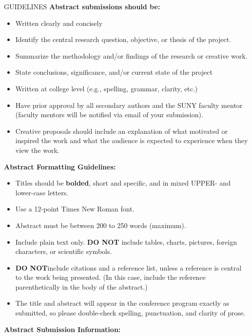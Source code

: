 \documentclass[12pt]{article}
\begin{document}
 GUIDELINES
    \textbf{Abstract submissions should be:}
    \begin{itemize}
    \item Written clearly and concisely
    \item Identify the central research question, objective, or thesis of the project.
    \item Summarize the methodology and/or findings of the research or creative work.
    \item State conclusions, significance, and/or current state of the project
    \item Written at college level (e.g., spelling, grammar, clarity, etc.)
    \item Have prior approval by all secondary authors and the SUNY faculty mentor (faculty mentors will be notified via email of your submission).
    \item Creative proposals should include an explanation of what motivated or inspired the work and what the audience is expected to experience when they view the work.
    \end{itemize}

    \textbf{Abstract Formatting Guidelines:}

    \begin{itemize}
    \item Titles should be \textbf{bolded}, short and specific, and in mixed UPPER- and lower-case letters.
    \item Use a 12-point Times New Roman font.
    \item Abstract must be between 200 to 250 words (maximum).
    \item Include plain text only. \textbf{DO NOT} include tables, charts, pictures, foreign characters, or scientific symbols.
    \item \textbf{DO NOT}include citations and a reference list, unless a reference is central to the work being presented. (In this case, include the reference parenthetically in the body of the abstract.)
    \item The title and abstract will appear in the conference program exactly as submitted, so please double-check spelling, punctuation, and clarity of prose.
    \end{itemize}


    \textbf{Abstract Submission Information:}
\end{document}
